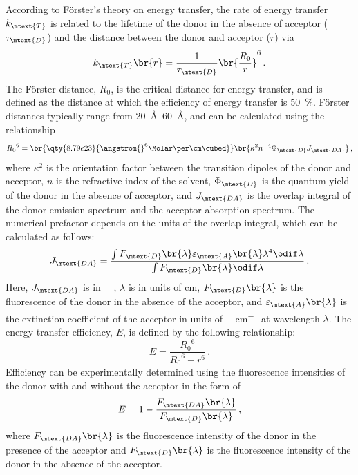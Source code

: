 According to Förster's theory on energy transfer, the rate of energy transfer \( k_\mtext{T} \) is related to the lifetime of the donor in the absence of acceptor (\( \tau_\mtext{D} \)) and the distance between the donor and acceptor (\( r \)) via
\begin{equation}
	k_\mtext{T}\br{r} = \frac{1}{\tau_\mtext{D}} \br{\frac{R_0}{r}}^6 \, .
\end{equation}
The Förster distance, \( R_0 \), is the critical distance for energy transfer, and is defined as the distance at which the efficiency of energy transfer is \qty{50}{\percent}. 
Förster distances typically range from \qtyrange{20}{60}{\angstrom}, and can be calculated using the relationship
\begin{equation}
	{R_0}^6 = \br{\qty{8.79e23}{\angstrom{}^6\Molar\per\cm\cubed}}
							\br{\kappa^2 n^{-4} \Phi_\mtext{D} J_\mtext{DA}} \, ,
  \label{eq:forster_dist}
\end{equation}
where \( \kappa^2 \) is the orientation factor between the transition dipoles of the donor and acceptor, \( n \) is the refractive index of the solvent, \( \Phi_\mtext{D} \) is the quantum yield of the donor in the absence of acceptor, and \( J_\mtext{DA} \) is the overlap integral of the donor emission spectrum and the acceptor absorption spectrum. 
The numerical prefactor depends on the units of the overlap integral, which can be calculated as follows:
\begin{equation}
	J_\mtext{DA} = \frac{\int F_\mtext{D}\br{\lambda}
											 \varepsilon_\mtext{A}\br{\lambda} 
											 \lambda^4 \odif\lambda}
											{\int F_\mtext{D}\br{\lambda}\odif\lambda} \, .
  \label{eq:overlap_int}
\end{equation}
Here, \( J_\mtext{DA} \) is in \unit{\per\Molar\cmc}, \( \lambda \) is in units of \unit{\cm}, \( F_\mtext{D}\br{\lambda} \) is the fluorescence of the donor in the absence of the acceptor, and \( \varepsilon_\mtext{A}\br{\lambda} \) is the extinction coefficient of the acceptor in units of \unit{\per\Molar\per\cm} at wavelength \( \lambda \). The energy transfer efficiency, \( E \), is defined by the following relationship:
\begin{equation}
	E = \frac{{R_0}^6}{{R_0}^6 + r^6} \, .
	\label{eq:dist_efficiency}
\end{equation}
Efficiency can be experimentally determined using the fluorescence intensities of the donor with and without the acceptor in the form of
\begin{equation}
	E = 1 - \frac{F_\mtext{DA}\br{\lambda}}{F_\mtext{D}\br{\lambda}} \, ,
	\label{eq:spec_efficiency}
\end{equation}
where \( F_\mtext{DA}\br{\lambda} \) is the fluorescence intensity of the donor in the presence of the acceptor and \( F_\mtext{D}\br{\lambda} \) is the fluorescence intensity of the donor in the absence of the acceptor. 

